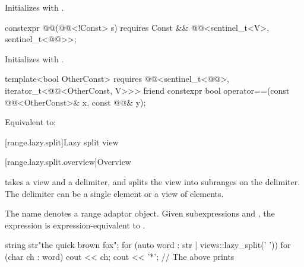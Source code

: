 \begin{itemdescr}
\pnum
\effects
Initializes  with .
\end{itemdescr}

\begin{itemdecl}
constexpr @@(@@<!Const> s)
  requires Const && @@<sentinel_t<V>, sentinel_t<@@>>;
\end{itemdecl}

\begin{itemdescr}
\pnum
\effects
Initializes  with .
\end{itemdescr}

\begin{itemdecl}
template<bool OtherConst>
  requires @@<sentinel_t<@@>, iterator_t<@@<OtherConst, V>>>
friend constexpr bool operator==(const @@<OtherConst>& x, const @@& y);
\end{itemdecl}

\begin{itemdescr}
\pnum
\effects
Equivalent to: 
\end{itemdescr}

[range.lazy.split]{Lazy split view}

[range.lazy.split.overview]{Overview}

\pnum
{} takes a view and a delimiter, and splits
the view into subranges on the delimiter. The delimiter can be
a single element or a view of elements.

\pnum
{}%
The name  denotes a
range adaptor object.
Given subexpressions  and ,
the expression  is expression-equivalent to
.

\pnum
\begin{example}
\begin{codeblock}
string str{"the quick brown fox"};
for (auto word : str | views::lazy_split(' ')) {
  for (char ch : word)
    cout << ch;
  cout << '*';
}
// The above prints 
\end{codeblock}
\end{example}

